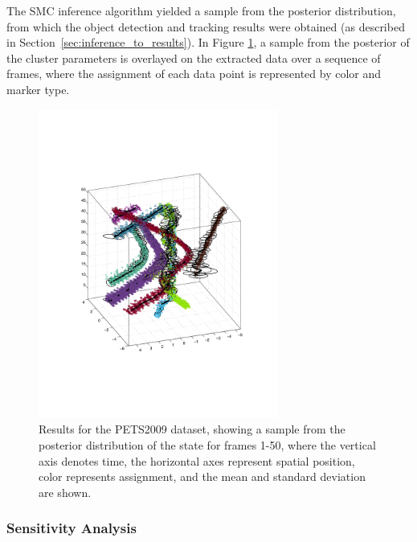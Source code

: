 \documentclass[smallcondensed, final]{svjour3}
\begin{document}
The SMC inference algorithm yielded a sample from the posterior distribution, from which the object detection and tracking results were obtained (as described in Section~\ref{sec:inference_to_results}). In Figure \ref{fig:pets2009_results}, a sample from the posterior of the cluster parameters is overlayed on the extracted data over a sequence of frames, where the assignment of each data point is represented by color and marker type.

\begin{figure}[!]
  \centering
  \includegraphics[width=0.7\textwidth]{../img/pets2009_1-50_front.pdf}
  \caption{Results for the PETS2009 dataset, showing a sample from the posterior distribution of the state for frames 1-50, where the vertical axis denotes time, the horizontal axes represent spatial position, color represents assignment, and the mean and standard deviation are shown.}
  \label{fig:pets2009_results}
\end{figure}






\subsubsection{Sensitivity Analysis}
\end{document}
